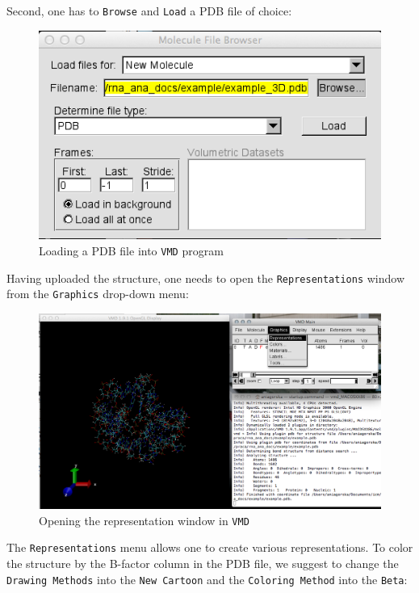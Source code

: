 \documentclass[12pt]{article}
\begin{document}
Second, one has to {\tt Browse} and {\tt Load} a PDB file of choice:
\begin{figure}[h!]
\centering
\includegraphics[scale=0.4]{./pictures/vmd2.png}
\caption{Loading a PDB file into {\tt VMD} program}
\end{figure}
\newpage
Having uploaded the structure, one needs to open the {\tt Representations} window from the {\tt Graphics} drop-down menu:
\begin{figure}[h!]
\centering
\includegraphics[scale=0.4]{./pictures/vmd3.png}
\caption{Opening the representation window in {\tt VMD}}
\end{figure}

The {\tt Representations} menu allows one to create various representations. To color the structure by the B-factor column in the PDB file, we suggest to change the {\tt Drawing Methods} into the {\tt New Cartoon} and the {\tt Coloring Method} into the {\tt Beta}:
\end{document}
